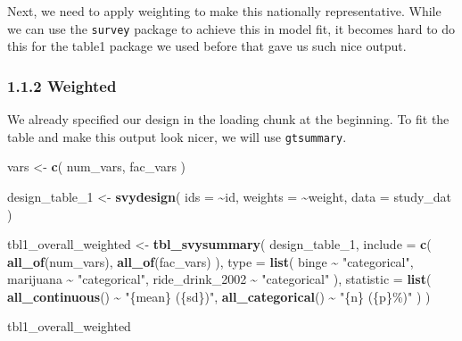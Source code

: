 \documentclass[
]{article}
\newenvironment{Shaded}{\begin{snugshade}}{\end{snugshade}}
\newcommand{\AttributeTok}[1]{\textcolor[rgb]{0.13,0.29,0.53}{#1}}
\newcommand{\FunctionTok}[1]{\textcolor[rgb]{0.13,0.29,0.53}{\textbf{#1}}}
\newcommand{\NormalTok}[1]{#1}
\newcommand{\OtherTok}[1]{\textcolor[rgb]{0.56,0.35,0.01}{#1}}
\newcommand{\SpecialCharTok}[1]{\textcolor[rgb]{0.81,0.36,0.00}{\textbf{#1}}}
\newcommand{\StringTok}[1]{\textcolor[rgb]{0.31,0.60,0.02}{#1}}
\begin{document}
Next, we need to apply weighting to make this nationally representative.
While we can use the \texttt{survey} package to achieve this in model
fit, it becomes hard to do this for the table1 package we used before
that gave us such nice output.

\subsubsection{1.1.2 Weighted}\label{weighted}

We already specified our design in the loading chunk at the beginning.
To fit the table and make this output look nicer, we will use
\texttt{gtsummary}.

\begin{Shaded}
\begin{Highlighting}[]
\NormalTok{vars }\OtherTok{\textless{}{-}} \FunctionTok{c}\NormalTok{(}
\NormalTok{  num\_vars,}
\NormalTok{  fac\_vars}
\NormalTok{)}

\NormalTok{design\_table\_1 }\OtherTok{\textless{}{-}} \FunctionTok{svydesign}\NormalTok{(}
  \AttributeTok{ids =} \SpecialCharTok{\textasciitilde{}}\NormalTok{id,}
  \AttributeTok{weights =} \SpecialCharTok{\textasciitilde{}}\NormalTok{weight,}
  \AttributeTok{data =}\NormalTok{ study\_dat}
\NormalTok{)}

\NormalTok{tbl1\_overall\_weighted }\OtherTok{\textless{}{-}} \FunctionTok{tbl\_svysummary}\NormalTok{(}
\NormalTok{  design\_table\_1,}
  \AttributeTok{include =} \FunctionTok{c}\NormalTok{(}
    \FunctionTok{all\_of}\NormalTok{(num\_vars),}
    \FunctionTok{all\_of}\NormalTok{(fac\_vars)}
\NormalTok{  ),}
   \AttributeTok{type =} \FunctionTok{list}\NormalTok{(}
\NormalTok{    binge }\SpecialCharTok{\textasciitilde{}} \StringTok{"categorical"}\NormalTok{,}
\NormalTok{    marijuana }\SpecialCharTok{\textasciitilde{}} \StringTok{"categorical"}\NormalTok{,}
\NormalTok{    ride\_drink\_2002 }\SpecialCharTok{\textasciitilde{}} \StringTok{"categorical"}
\NormalTok{  ),}
  \AttributeTok{statistic =} \FunctionTok{list}\NormalTok{(}
    \FunctionTok{all\_continuous}\NormalTok{() }\SpecialCharTok{\textasciitilde{}} \StringTok{"\{mean\} (\{sd\})"}\NormalTok{,}
    \FunctionTok{all\_categorical}\NormalTok{() }\SpecialCharTok{\textasciitilde{}} \StringTok{"\{n\} (\{p\}\%)"}
\NormalTok{  )}
\NormalTok{)}

\NormalTok{tbl1\_overall\_weighted }
\end{Highlighting}
\end{Shaded}
\end{document}
